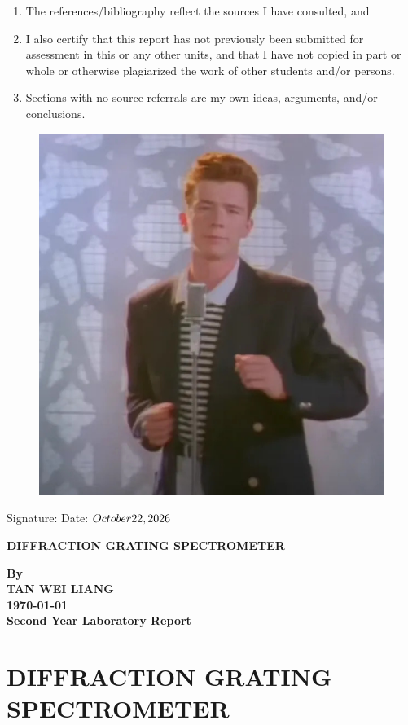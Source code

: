 \documentclass[a4paper,11pt]{article}
\begin{document}
\begin{enumerate}
    \item The references/bibliography reflect the sources I have consulted, and
    \item I also certify that this report has not previously been submitted for assessment in this or any other units, and that I have not copied in part or whole or otherwise plagiarized the work of other students and/or persons.
    \item Sections with no source referrals are my own ideas, arguments, and/or conclusions.
\end{enumerate}

\bigskip
\begin{figure}[htbp]
\hspace{35mm}
\includegraphics[width=0.1\linewidth]{signature}
\label{6}
\vspace{-12mm}
\end{figure}
\noindent Signature: \hrulefill \hfill Date: \uline{$\today$}

\newpage

\thispagestyle{empty}


\begin{center}
\vspace*{1cm}
\textbf{\Large DIFFRACTION GRATING SPECTROMETER}

\vspace{3.0cm}
\textbf{\Large By}\\

\vspace{3.0cm}
\textbf{\Large TAN WEI LIANG} \\

\vspace{6.0cm}
\textbf{\Large \today}\\

\vfill
\textbf{\Large Second Year Laboratory Report}
\end{center}
\newpage

\section*{\Large \center DIFFRACTION GRATING SPECTROMETER}
\end{document}
